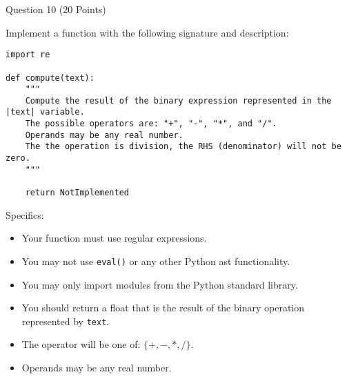\documentclass{article}
\begin{document}

\vspace{2cm}


\begin{minipage}{\textwidth}
    \noindent
    Question 10 (20 Points)
    \vspace{0.5cm}

    \noindent
    Implement a function with the following signature and description:

    \begin{lstlisting}
import re

def compute(text):
    """
    Compute the result of the binary expression represented in the |text| variable.
    The possible operators are: "+", "-", "*", and "/".
    Operands may be any real number.
    The the operation is division, the RHS (denominator) will not be zero.
    """

    return NotImplemented
    \end{lstlisting}

    Specifics:
    \begin{itemize}
        \item Your function must use regular expressions.
        \item You may not use \verb|eval()| or any other Python ast functionality.
        \item You may only import modules from the Python standard library.
        \item You should return a float that is the result of the binary operation represented by \verb|text|.
        \item The operator will be one of:  $ \{+, -, *, /\} $.
        \item Operands may be any real number.
    \end{itemize}

    \vspace{0.5cm}

    \vspace{10cm}

\end{minipage}

\end{document}
